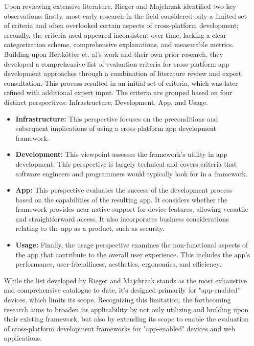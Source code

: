 Upon reviewing extensive literature, Rieger and Majchrzak identified two key observations: firstly, most early research in the field considered only a limited set of criteria and often overlooked certain aspects of cross-platform development; secondly, the criteria used appeared inconsistent over time, lacking a clear categorization scheme, comprehensive explanations, and measurable metrics.
Building upon Heitkötter et. al's work and their own prior research, they developed a comprehensive list of evaluation criteria for cross-platform app development approaches through a combination of literature review and expert consultation. This process resulted in an initial set of criteria, which was later refined with additional expert input. The criteria are grouped based on four distinct perspectives: Infrastructure, Development, App, and Usage.
\begin{itemize}
    \item \textbf{Infrastructure:} This perspective focuses on the preconditions and subsequent implications of using a cross-platform app development framework.
    \item \textbf{Development:} This viewpoint assesses the framework's utility in app development. This perspective is largely technical and covers criteria that software engineers and programmers would typically look for in a framework.
    \item \textbf{App:} This perspective evaluates the success of the development process based on the capabilities of the resulting app. It considers whether the framework provides near-native support for device features, allowing versatile and straightforward access. It also incorporates business considerations relating to the app as a product, such as security.
    \item \textbf{Usage:} Finally, the usage perspective examines the non-functional aspects of the app that contribute to the overall user experience. This includes the app's performance, user-friendliness, aesthetics, ergonomics, and efficiency.
\end{itemize}
While the list developed by Rieger and Majchrzak stands as the most exhaustive and comprehensive catalogue to date, it's designed primarily for "app-enabled" devices, which limits its scope. Recognizing this limitation, the forthcoming research aims to broaden its applicability by not only utilizing and building upon their existing framework, but also by extending its scope to enable the evaluation of cross-platform development frameworks for "app-enabled" devices and web applications.




